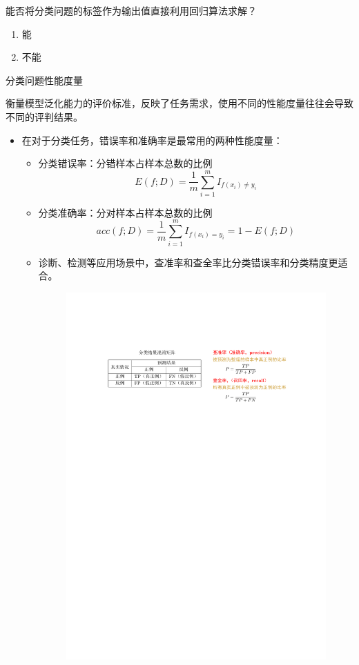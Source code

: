 \begin{example}
    能否将分类问题的标签作为输出值直接利用回归算法求解？
    \begin{enumerate}[A]
        \item 能
        \item \textcolor{main1}{不能}
    \end{enumerate}
\end{example}

\textcolor{main1}{分类问题性能度量}

衡量模型泛化能力的评价标准，反映了任务需求，使用不同的性能度量往往会导致不同的评判结果。
\begin{itemize}
    \item  在对于分类任务，错误率和准确率是最常用的两种性能度量：
    \begin{itemize}
        \item 分类错误率：分错样本占样本总数的比例
        \[
            E(f;D) = \dfrac{1}{m}\sum_{i = 1}^{m}I_{f(x_i)\neq y_i}
        \]
        \item 分类准确率：分对样本占样本总数的比例
        \[
            acc(f;D) = \dfrac{1}{m}\sum_{i = 1}^{m}I_{f(x_i)= y_i} = 1-E(f;D)
        \]
        \item 诊断、检测等应用场景中，查准率和查全率比分类错误率和分类精度更适合。
        \begin{figure}[htbp]
            \centering
            \includegraphics{image/混淆矩阵.pdf}
        \end{figure}


\end{itemize}
\end{itemize}
